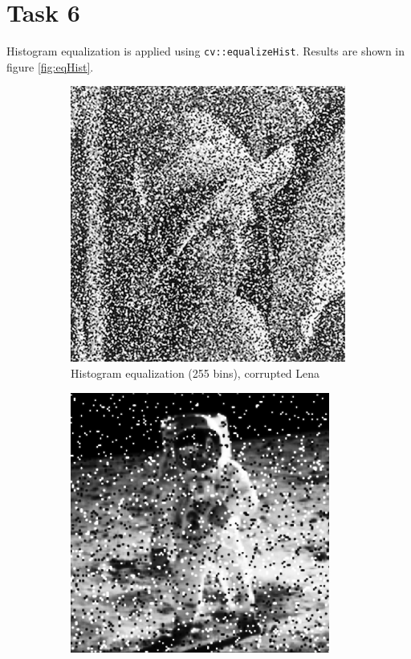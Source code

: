 \documentclass{article}
\begin{document}
\section*{Task 6}
Histogram equalization is applied using \texttt{cv::equalizeHist}.
Results are shown in figure \ref{fig:eqHist}.
\begin{figure}[H]
	\centering
	\begin{subfigure}{0.3\textwidth}
		\includegraphics[width=\textwidth]{Generated/Lena_corrupted_eqHistOneChannel255bins.png}
		\caption{Histogram equalization (255 bins), corrupted Lena}
	\end{subfigure}
	\hfill
	\begin{subfigure}{0.3\textwidth}
		\includegraphics[width=\textwidth]{Generated/Astronaut_salt_pepper_eqHistOneChannel255bins.png}

\end{subfigure}
\end{figure}
\end{document}
